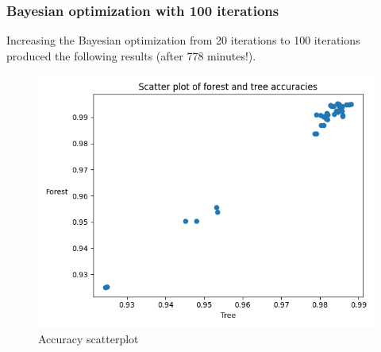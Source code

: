 \documentclass[12pt, letterpaper]{article}
\begin{document}
\subsubsection{Bayesian optimization with 100 iterations}

Increasing the Bayesian optimization from 20 iterations to 100 iterations produced the following results (after 778 minutes!).

\begin{figure}[H]
    \centering
    \includegraphics[scale=0.7]{accuracy_scatterplot_100.png}
    \caption{Accuracy scatterplot}
    \label{acc_plt_100} %
\end{figure}
\end{document}
